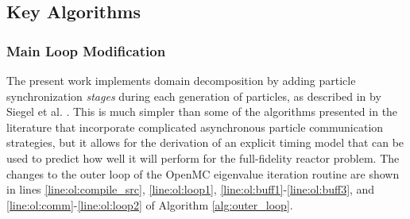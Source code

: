 \documentclass[12pt,twoside]{mitthesis-exec}
\begin{document}
\subsection*{Key Algorithms}

\subsubsection*{Main Loop Modification}

The present work implements domain decomposition by adding particle
synchronization \emph{stages} during each generation of particles, as described
in by Siegel et al. \cite{Siegel2}. This is much simpler than some of the
algorithms presented in the literature that incorporate complicated asynchronous
particle communication strategies, but it allows for the derivation of an
explicit timing model that can be used to predict how well it will perform for
the full-fidelity reactor problem. The changes to the outer loop of the OpenMC
eigenvalue iteration routine are shown in lines \ref{line:ol:compile_src},
\ref{line:ol:loop1}, \ref{line:ol:buff1}-\ref{line:ol:buff3}, and
\ref{line:ol:comm}-\ref{line:ol:loop2} of Algorithm \ref{alg:outer_loop}.
\end{document}
